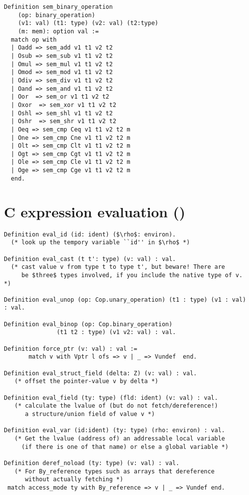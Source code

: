 \documentclass[12pt,fleqn,openany,oneside,showtrims]{memoir}
\newcommand{\ychapter}[2]{\chapter[#1]{#1 \hfill \normalsize #2}}
\begin{document}
\begin{lstlisting}
Definition sem_binary_operation
    (op: binary_operation)
    (v1: val) (t1: type) (v2: val) (t2:type)
    (m: mem): option val :=
  match op with
  | Oadd => sem_add v1 t1 v2 t2
  | Osub => sem_sub v1 t1 v2 t2 
  | Omul => sem_mul v1 t1 v2 t2
  | Omod => sem_mod v1 t1 v2 t2
  | Odiv => sem_div v1 t1 v2 t2 
  | Oand => sem_and v1 t1 v2 t2
  | Oor  => sem_or v1 t1 v2 t2
  | Oxor  => sem_xor v1 t1 v2 t2
  | Oshl => sem_shl v1 t1 v2 t2
  | Oshr  => sem_shr v1 t1 v2 t2   
  | Oeq => sem_cmp Ceq v1 t1 v2 t2 m
  | One => sem_cmp Cne v1 t1 v2 t2 m
  | Olt => sem_cmp Clt v1 t1 v2 t2 m
  | Ogt => sem_cmp Cgt v1 t1 v2 t2 m
  | Ole => sem_cmp Cle v1 t1 v2 t2 m
  | Oge => sem_cmp Cge v1 t1 v2 t2 m
  end.
\end{lstlisting}

\ychapter{C expression evaluation}{()}

\begin{lstlisting}
Definition eval_id (id: ident) ($\rho$: environ).
  (* look up the tempory variable ``id'' in $\rho$ *)

Definition eval_cast (t t': type) (v: val) : val.
  (* cast value v from type t to type t', but beware! There are
     be $three$ types involved, if you include the native type of v. *)

Definition eval_unop (op: Cop.unary_operation) (t1 : type) (v1 : val) : val.

Definition eval_binop (op: Cop.binary_operation) 
               (t1 t2 : type) (v1 v2: val) : val.

Definition force_ptr (v: val) : val :=
       match v with Vptr l ofs => v | _ => Vundef  end.

Definition eval_struct_field (delta: Z) (v: val) : val.
   (* offset the pointer-value v by delta *)

Definition eval_field (ty: type) (fld: ident) (v: val) : val.
   (* calculate the lvalue of (but do not fetch/dereference!)
      a structure/union field of value v *)

Definition eval_var (id:ident) (ty: type) (rho: environ) : val.
   (* Get the lvalue (address of) an addressable local variable
     (if there is one of that name) or else a global variable *)

Definition deref_noload (ty: type) (v: val) : val.
   (* For By_reference types such as arrays that dereference
      without actually fetching *)
 match access_mode ty with By_reference => v | _ => Vundef end.
\end{lstlisting}
\end{document}
